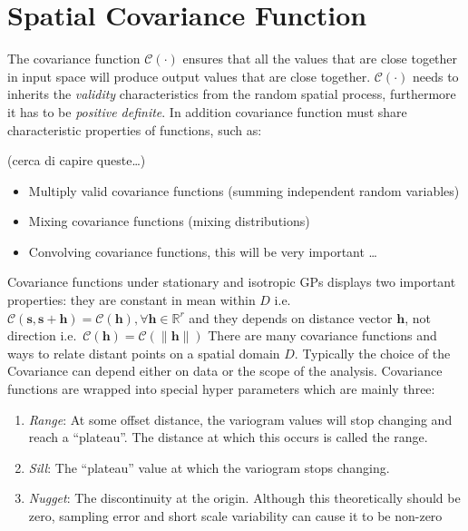 \documentclass[
  12pt,
  a4paper,
  oneside]{book}
\providecommand{\tightlist}{%
  \setlength{\itemsep}{0pt}\setlength{\parskip}{0pt}}
\theoremstyle{definition}
\theoremstyle{definition}
\theoremstyle{definition}
\theoremstyle{remark}
\begin{document}
\hypertarget{spatial-covariance-function}{%
\section{Spatial Covariance Function}\label{spatial-covariance-function}}

The covariance function \(\mathcal{C}(\cdot)\) ensures that all the values that are close together in input space will produce output values that are close together. \(\mathcal{C}(\cdot)\) needs to inherits the \emph{validity} characteristics from the random spatial process, furthermore it has to be \emph{positive definite}.
In addition covariance function must share characteristic properties of functions, such as:

(cerca di capire queste\ldots)

\begin{itemize}
\tightlist
\item
  Multiply valid covariance functions (summing independent random variables)
\item
  Mixing covariance functions (mixing distributions)
\item
  Convolving covariance functions, this will be very important \ldots{}
\end{itemize}

Covariance functions under stationary and isotropic GPs displays two important properties: they are constant in mean within \(D\) i.e.~\(\mathcal{C}(\mathbf{s}, \mathbf{s}+\mathbf{h})=\mathcal{C}(\mathbf{h}), \forall \mathbf{h} \in \mathbb{R}^{r}\) and they depends on distance vector \(\mathbf{h}\), not direction i.e.~\(\mathcal{C}(\mathbf{h})=\mathcal{C}(\|\mathbf{h}\|)\)
There are many covariance functions and ways to relate distant points on a spatial domain \(D\). Typically the choice of the Covariance can depend either on data or the scope of the analysis. Covariance functions are wrapped into special hyper parameters which are mainly three:

\begin{enumerate}
\def\labelenumi{\arabic{enumi}.}
\tightlist
\item
  \emph{Range}: At some offset distance, the variogram values will stop changing and reach a ``plateau''. The distance at which this occurs is called the range.
\item
  \emph{Sill}: The ``plateau'' value at which the variogram stops changing.
\item
  \emph{Nugget}: The discontinuity at the origin. Although this theoretically should be zero, sampling error and short scale variability can cause it to be non-zero
\end{enumerate}
\end{document}
